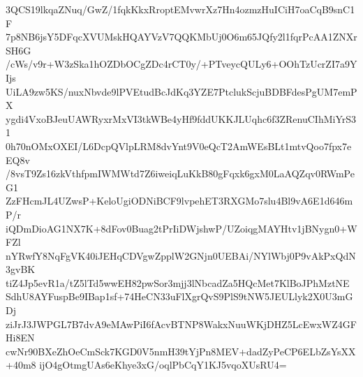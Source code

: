 3QCS19lkqaZNuq/GwZ/1fqkKkxRroptEMvwrXz7Hn4ozmzHuICiH7oaCqB9snC1F
7p8NB6jsY5DFqcXVUMskHQAYVzV7QQKMbUj0O6m65JQfy2l1fqrPcAA1ZNXrSH6G
/cWs/v9r+W3zSka1hOZDbOCgZDc4rCT0y/+PTveycQULy6+OOhTzUcrZI7a9YIjs
UiLA9zw5KS/nuxNbvde9lPVEtudBcJdKq3YZE7PtclukScjuBDBFdesPgUM7emPX
ygdi4VxoBJeuUAWRyxrMxVI3tkWBe4yHf9fddUKKJLUqhc6f3ZRenuCIhMiYrS31
0h70nOMxOXEI/L6DcpQVlpLRM8dvYnt9V0eQcT2AmWEsBLt1mtvQoo7fpx7eEQ8v
/8vsT9Zs16zkVthfpmIWMWtd7Z6iweiqLuKkB80gFqxk6gxM0LaAQZqv0RWmPeG1
ZzFHcmJL4UZwsP+KeloUgiODNiBCF9lvpehET3RXGMo7slu4Bl9vA6E1d646mP/r
iQDmDioAG1NX7K+8dFov0Buag2tPrIiDWjshwP/UZoiqgMAYHtv1jBNygn0+WFZl
nYRwfY8NqFgVK40iJEHqCDVgwZpplW2GNjn0UEBAi/NYlWbj0P9vAkPxQdN3gvBK
tiZ4Jp5evR1a/tZ5lTd5wwEH82pwSor3mjj3lNbcadZa5HQcMet7KlBoJPhMztNE
SdhU8AYFuspBe9IBap1sf+74HeCN33uFlXgrQvS9PlS9tNW5JEULlyk2X0U3mGDj
ziJrJ3JWPGL7B7dvA9eMAwPiI6fAcvBTNP8WakxNuuWKjDHZ5LcEwxWZ4GFHi8EN
cwNr90BXeZhOeCmSck7KGD0V5nmH39tYjPn8MEV+dadZyPeCP6ELbZsYsXX+40m8
ijO4gOtmgUAs6eKhye3xG/oqlPbCqY1KJ5vqoXUsRU4=
